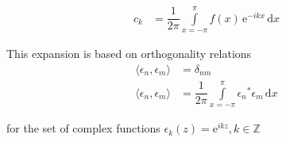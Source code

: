 \documentclass{article}
\begin{document}
\begin{align*} 
c_k &=  \dfrac{1}{2 \pi} \int \limits_{x=-\pi}^{\pi} f(x) \, \mathrm{e}^{-i k x} \, \mathrm{d} x
\end{align*}

This expansion is based on orthogonality relations
\begin{align*} 
\langle \epsilon_n, \epsilon_m \rangle &= \delta_{n m} \\
\langle \epsilon_n, \epsilon_m \rangle &= \dfrac{1}{2 \pi} \int \limits_{x=-\pi}^{\pi} {\epsilon_n}^* {\epsilon_m} \, \mathrm{d} x
\end{align*}

for the set of complex functions $\epsilon_k(z) = \mathrm{e}^{i k z}, k \in \mathbb{Z}$
\end{document}
